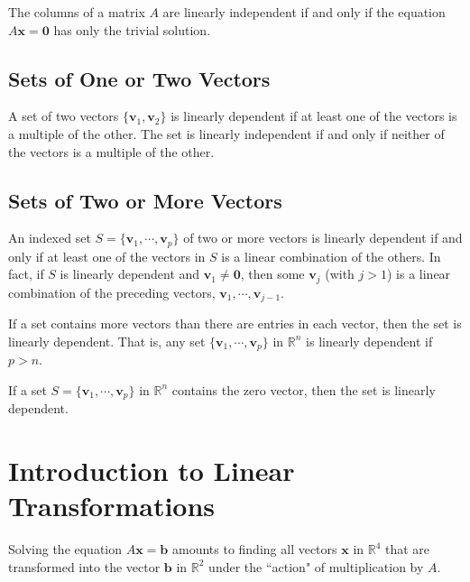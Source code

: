 \documentclass[12pt,a4paper]{article}
\renewcommand{\vec}[1]{\boldsymbol{#1}}
\begin{document}
The columns of a matrix $A$ are linearly independent if and only if the equation $A\vec{x} = \vec{0}$ has only the trivial solution.
 
\subsection{Sets of One or Two Vectors}
A set of two vectors $\{\vec{v}_1 , \vec{v}_2 \}$ is linearly dependent if at least one of the vectors is a multiple of the other. The set is linearly independent if and only if neither of the vectors is a multiple of the other.



\subsection{Sets of Two or More Vectors}
\begin{tcolorbox}[colback=green!5,colframe=green!40!black,title= Characterization of Linearly Dependent Sets]
An indexed set $S = \{\vec{v}_1, \cdots, \vec{v}_p\}$ of two or more vectors is linearly dependent if and only if at least one of the vectors in $S$ is a linear combination of the others. In fact, if $S$ is linearly dependent and $\vec{v}_1 \neq \vec{0}$, then some $\vec{v}_j$ (with $j > 1$) is a linear combination of the preceding vectors, $\vec{v}_1, \cdots, \vec{v}_{j-1}$.
\end{tcolorbox}


\begin{tcolorbox}[colback=green!5,colframe=green!40!black,title= Theorem]
If a set contains more vectors than there are entries in each vector, then the set is linearly dependent. That is, any set $\{\vec{v}_1, \cdots, \vec{v}_p\}$ in $\mathbb R^n$ is linearly dependent if $p > n$.
\end{tcolorbox}


\begin{tcolorbox}[colback=green!5,colframe=green!40!black,title= Theorem]
If a set $S = \{\vec{v}_1, \cdots, \vec{v}_p\}$ in $\mathbb R^n$ contains the zero vector, then the set is linearly dependent.
\end{tcolorbox}



\section{Introduction to Linear Transformations}
Solving the equation $A\vec{x} = \vec{b}$ amounts to finding all vectors $\vec{x}$ in $\mathbb R^4$ that are transformed into the vector $\vec{b}$ in $\mathbb R^2$ under the ``action" of multiplication by $A$.
\end{document}
